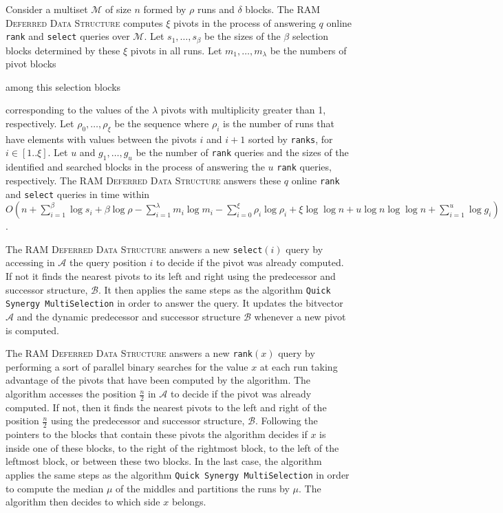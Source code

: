 \begin{INUTILE}
  \begin{theorem}\label{theo:online-ram}
    Consider a multiset $\mathcal{M}$ of size $n$ formed by $\rho$
    runs and $\delta$ blocks. The \textsc{RAM Deferred Data Structure}
    computes $\xi$ pivots in the process of answering $q$ online
    \texttt{rank} and \texttt{select} queries over $\mathcal{M}$. Let
    $s_1, \dots, s_{\beta}$ be the sizes of the $\beta$ selection
    blocks determined by these $\xi$ pivots in all runs. Let
    $m_1, \dots, m_\lambda$ be the numbers of pivot blocks
    \begin{LONG}
      among this selection blocks
    \end{LONG}
    corresponding to the values of the $\lambda$ pivots with
    multiplicity greater than 1, respectively.  Let
    $\rho_0, \dots, \rho_\xi$ be the sequence where $\rho_i$ is the
    number of runs that have elements with values between the pivots
    $i$ and $i+1$ sorted by \texttt{ranks}, for $i\in[1..\xi]$.  Let
    $u$ and $g_1, \dots, g_u $ be the number of \texttt{rank} queries
    and the sizes of the identified and searched blocks in the process
    of answering the $u$ \texttt{rank} queries, respectively. The
    \textsc{RAM Deferred Data Structure} answers these $q$ online
    \texttt{rank} and \texttt{select} queries in time within
    $O(n + \sum^{\beta}_{i=1}\log{s_i} + \beta\log{\rho} -
    \sum^{\lambda}_{i=1}m_i\log{m_i} -
    \sum^{\xi}_{i=0}\rho_i\log{\rho_i} + \xi\log\log{n} +
    u\log{n}\log\log{n} + \sum^{u}_{i=1}\log{g_i})$.
  \end{theorem}
\end{INUTILE}

The \textsc{RAM Deferred Data Structure} answers a new
\texttt{select}$(i)$ query by accessing in $\mathcal{A}$ the query
position $i$ to decide if the pivot was already computed. If not it finds
the nearest pivots to its left and right using the predecessor and
successor structure, $\mathcal{B}$. It then
applies the same steps as the algorithm \texttt{Quick Synergy
  MultiSelection} in order to answer the query. It updates the
bitvector $\mathcal{A}$ and the dynamic predecessor and successor
structure $\mathcal{B}$ whenever a new pivot is computed.

The \textsc{RAM Deferred Data Structure} answers a new
\texttt{rank}$(x)$ query by performing a sort of parallel binary
searches for the value $x$ at each run taking advantage of the pivots
that have been computed by the algorithm. The algorithm accesses the
position $\frac{n}{2}$ in $\mathcal{A}$ to decide if the pivot was
already computed. If not, then it finds the nearest
pivots to the left and right of the position $\frac{n}{2}$ using the
predecessor and successor structure, $\mathcal{B}$. Following the
pointers to the blocks that contain these pivots the algorithm decides
if $x$ is inside one of these blocks, to the right of the rightmost
block, to the left of the leftmost block, or between these two
blocks. In the last case, the algorithm applies the same steps as the
algorithm \texttt{Quick Synergy MultiSelection} in order to compute
the median $\mu$ of the middles and partitions the runs by
$\mu$. The algorithm then decides to which side $x$ belongs.

